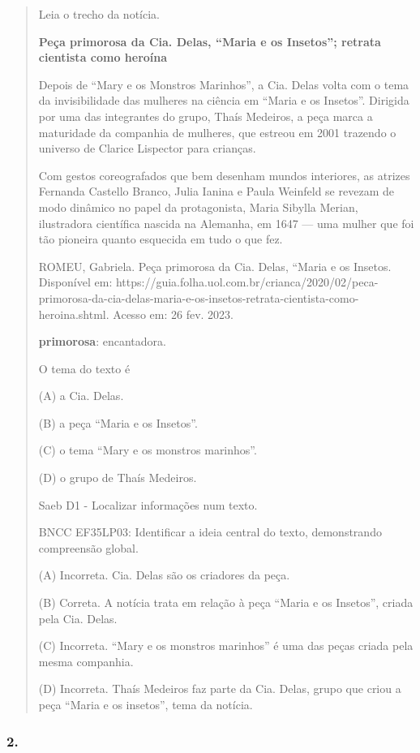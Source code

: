 \begin{quote}
Leia o trecho da notícia.

\textbf{Peça primorosa da Cia. Delas, ``Maria e os Insetos''; retrata
cientista como heroína}

Depois de ``Mary e os Monstros Marinhos'', a Cia. Delas volta com o tema
da invisibilidade das mulheres na ciência em ``Maria e os Insetos''.
Dirigida por uma das integrantes do grupo, Thaís Medeiros, a peça marca
a maturidade da companhia de mulheres, que estreou em 2001 trazendo o
universo de Clarice Lispector para crianças.

Com gestos coreografados que bem desenham mundos interiores​, as atrizes
Fernanda Castello Branco, Julia Ianina e Paula Weinfeld se revezam de
modo dinâmico no papel da protagonista, Maria Sibylla Merian,
ilustradora científica nascida na Alemanha, em 1647 --- uma mulher que
foi tão pioneira quanto esquecida em tudo o que fez.

ROMEU, Gabriela. Peça primorosa da Cia. Delas, ``Maria e os Insetos.
Disponível em:
https://guia.folha.uol.com.br/crianca/2020/02/peca-primorosa-da-cia-delas-maria-e-os-insetos-retrata-cientista-como-heroina.shtml.
Acesso em: 26 fev. 2023.

\textbf{primorosa}: encantadora.

O tema do texto é

(A) a Cia. Delas.

(B) a peça ``Maria e os Insetos''.

(C) o tema ``Mary e os monstros marinhos''.

(D) o grupo de Thaís Medeiros.

Saeb D1 - Localizar informações num texto.

BNCC EF35LP03: Identificar a ideia central do texto, demonstrando
compreensão global.

(A) Incorreta. Cia. Delas são os criadores da peça.

(B) Correta. A notícia trata em relação à peça ``Maria e os Insetos'',
criada pela Cia. Delas.

(C) Incorreta. ``Mary e os monstros marinhos'' é uma das peças criada
pela mesma companhia.

(D) Incorreta. Thaís Medeiros faz parte da Cia. Delas, grupo que criou a
peça ``Maria e os insetos'', tema da notícia.
\end{quote}

\subsubsection{2. }\label{section-81}

